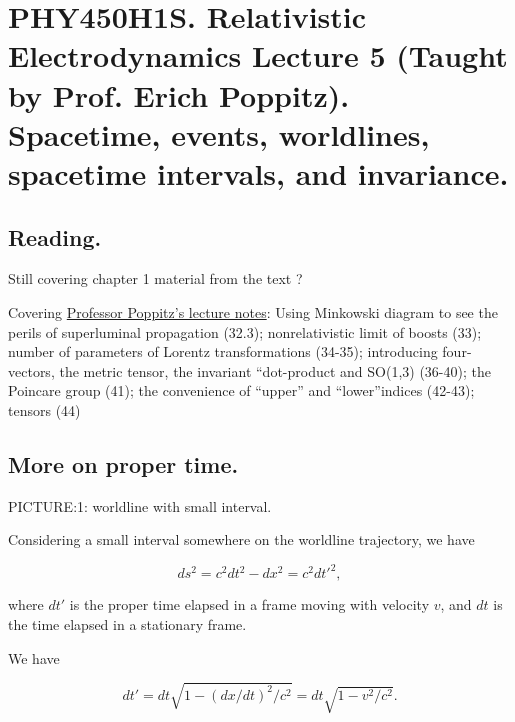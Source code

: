 
%

\chapter{PHY450H1S.  Relativistic Electrodynamics Lecture 5 (Taught by Prof. Erich Poppitz).  Spacetime, events, worldlines, spacetime intervals, and invariance.}
\label{chap:relativisticElectrodynamicsL5}
{}
\date{Jan 18, 2011}

\beginArtNoToc

\section{Reading.}

Still covering chapter 1 material from the text \cite{landau1980classical}?

Covering \href{http://www.physics.utoronto.ca/~poppitz/e-poppitz/PHY450_files/RelEM27-44.pdf}{Professor Poppitz's lecture notes}: Using Minkowski diagram to see the perils of superluminal propagation (32.3); nonrelativistic limit of boosts (33); number of parameters of Lorentz transformations (34-35); introducing four-vectors, the metric tensor, the invariant ``dot-product and SO(1,3) (36-40); the Poincare group (41); the convenience of ``upper'' and ``lower''indices (42-43); tensors (44) 

\section{More on proper time.}

PICTURE:1: worldline with small interval.

Considering a small interval somewhere on the worldline trajectory, we have

\begin{equation}\label{eqn:relativisticElectrodynamicsL5:10}
ds^2 = c^2 dt^2 - dx^2 = c^2 {dt'}^2,
\end{equation}

where $dt'$ is the proper time elapsed in a frame moving with velocity $v$, and $dt$ is the time elapsed in a stationary frame.

We have 

\begin{equation}\label{eqn:relativisticElectrodynamicsL5:20}
dt' = dt \sqrt{ 1 - (dx/dt)^2/c^2 } = dt \sqrt{ 1 - v^2/c^2 }.
\end{equation}

